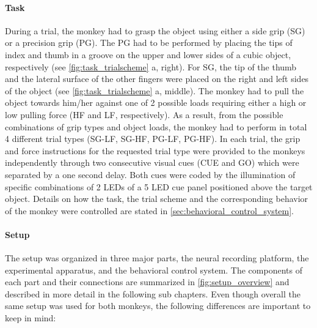 {\paragraph{Task}

During a trial, the monkey had to grasp the object using either a side grip (SG) or a precision grip (PG). The PG had to be performed by placing the tips of index and thumb in a groove on the upper and lower sides of a cubic object, respectively (see \cref{fig:task_trialscheme} a, right). For SG, the tip of the thumb and the lateral surface of the other fingers were placed on the right and left sides of the object (see \cref{fig:task_trialscheme} a, middle). The monkey had to pull the object towards him/her against one of 2 possible loads requiring either a high or low pulling force (HF and LF, respectively). As a result, from the possible combinations of grip types and object loads, the monkey had to perform in total 4 different trial types (SG-LF, SG-HF, PG-LF, PG-HF). In each trial, the grip and force instructions for the requested trial type were provided to the monkeys independently through two consecutive visual cues (CUE and GO) which were separated by a one second delay. Both cues were coded by the illumination of specific combinations of 2 LEDs of a 5 LED cue panel positioned above the target object. Details on how the task, the trial scheme and the corresponding behavior of the monkey were controlled are stated in \cref{sec:behavioral_control_system}.

\paragraph{Setup}

The setup was organized in three major parts, the neural recording platform, the experimental apparatus, and the behavioral control system. The components of each part and their connections are summarized in \cref{fig:setup_overview} and described in more detail in the following sub chapters. Even though overall the same setup was used for both monkeys, the following differences are important to keep in mind: 

}
